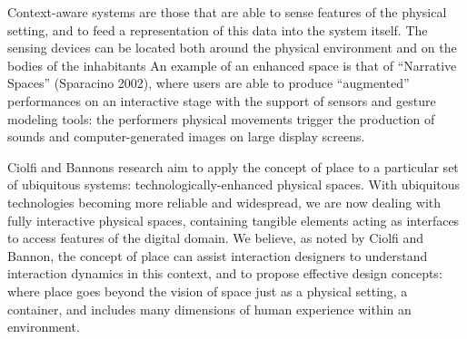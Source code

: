 Context-aware systems are those that are able to sense features of the physical setting, and to feed a representation of this data into the system itself. The sensing devices can be located both around the physical environment and on the bodies of the inhabitants \autocite[p. 218]{ciolfi_space_2005} An example of an enhanced space is that of “Narrative Spaces” (Sparacino 2002), where users are able to produce “augmented” performances on an interactive stage with the support of sensors and gesture modeling tools: the performers physical movements trigger the production of sounds and computer-generated images on large display screens\autocite[p. 219]{ciolfi_space_2005}. 

Ciolfi and Bannons research aim to apply the concept of place to a particular set of ubiquitous systems: technologically-enhanced physical spaces. With ubiquitous technologies becoming more reliable and widespread, we are now dealing with fully interactive physical spaces, containing tangible elements acting as interfaces to access features of the digital domain. We believe, as noted by Ciolfi and Bannon, the concept of place can assist interaction designers to understand interaction dynamics in this context, and to propose effective design concepts: where place goes beyond the vision of space just as a physical setting, a container, and includes many dimensions of human experience within an environment\autocite[p. 221]{ciolfi_space_2005}.
